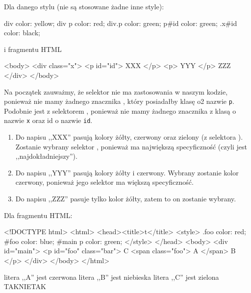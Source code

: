 \begin{solutions}
    \sol Dla danego stylu (nie są stosowane żadne inne style):
    \begin{css}
        div {color: yellow;}
        div p {color: red;}
        div.p {color: green;}
        p#id {color: green;}
        .x#id {color: black;}
    \end{css}
    i fragmentu HTML
    \begin{html}
        <body>
            <div class="x">
                <p id="id"> XXX </p>
                <p> YYY </p>
                ZZZ
            </div>
        </body>
    \end{html}

    Na początek zauważmy, że selektor  nie ma zastosowania w naszym kodzie, ponieważ nie mamy żadnego znacznika , który posiadałby klasę o2 nazwie \texttt{p}. Podobnie jest z selektorem , ponieważ nie mamy żadnego znacznika z klasą o nazwie \texttt{x} oraz id o nazwie \texttt{id}.

    \begin{enumerate}[\bf A.]
        \item Do napisu ,,XXX'' pasują kolory żółty, czerwony oraz zielony (z selektora ). Zostanie wybrany selektor , ponieważ ma największą specyficzność (czyli jest ,,najdokładniejszy'').

        \item Do napisu ,,YYY'' pasują kolory żółty i czerwony. Wybrany zostanie kolor czerwony, ponieważ jego selektor ma większą specyficzność.

        \item Do napisu ,,ZZZ'' pasuje tylko kolor żółty, zatem to on zostanie wybrany.
    \end{enumerate}

    \sol Dla fragmentu HTML:
    \begin{html}
        <!DOCTYPE html>
        <html>
        <head><title>t</title>
        <style>
            .foo {color: red;}
            #foo {color: blue;}
            #main p {color: green;}
        </style>
        </head>
        <body>
            <div id="main">
                <p id="foo" class="bar">
                    C
                    <span class="foo"> A </span>
                    B
                </p>
            </div>
        </body>
        </html>
    \end{html}
    \answerss
    {litera ,,A'' jest czerwona}
    {litera ,,B'' jest niebieska}
    {litera ,,C'' jest zielona}
    {TAK}{NIE}{TAK}


\end{solutions}
